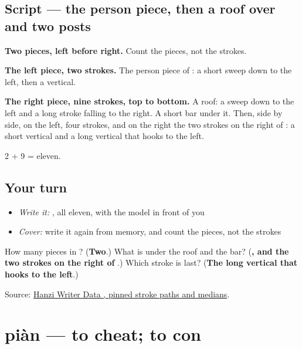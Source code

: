 \subsection*{Script — the person piece, then a roof over  and two posts}

\begin{quote}
\end{quote}

\textbf{Two pieces, left before right.} Count the pieces, not the strokes.

\textbf{The left piece, two strokes.} The person piece of : a short sweep down to the left, then a vertical.

\textbf{The right piece, nine strokes, top to bottom.} A roof: a sweep down to the left and a long stroke falling to the right. A short bar under it. Then, side by side,  on the left, four strokes, and on the right the two strokes on the right of : a short vertical and a long vertical that hooks to the left.

2 + 9 = eleven.

\subsection*{Your turn}
\begin{itemize}
\raggedright
  \item \emph{Write it:} , all eleven, with the model in front of you
  \item \emph{Cover:} write it again from memory, and count the pieces, not the strokes
\end{itemize}

\begin{tcolorbox}[breakable,colback=teal!4,colframe=teal!35!black,title={Before you move on}]
How many pieces in ? (\textbf{Two}.) What is under the roof and the bar? (\textbf{, and the two strokes on the right of }.) Which stroke is last? (\textbf{The long vertical that hooks to the left}.)

Source: \href{https://raw.githubusercontent.com/chanind/hanzi-writer-data/68d10a4b21150cae5e1ebbd223eed289cf32d90c/data/\%E5\%81\%B7.json}{Hanzi Writer Data , pinned stroke paths and medians}.
\end{tcolorbox}
\section[piàn]{piàn — to cheat; to con}

